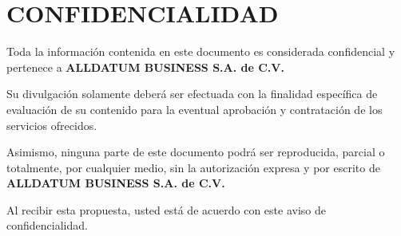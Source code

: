 \section*{CONFIDENCIALIDAD}

Toda la información contenida en este documento es considerada confidencial y pertenece a \textbf{ALLDATUM BUSINESS S.A. de C.V.}

Su divulgación solamente deberá ser efectuada con la finalidad específica de evaluación de su contenido para la eventual aprobación y contratación de los servicios ofrecidos.

Asimismo, ninguna parte de este documento podrá ser reproducida, parcial o totalmente, por cualquier medio, sin la autorización expresa y por escrito de \textbf{ALLDATUM BUSINESS S.A. de C.V.}

Al recibir esta propuesta, usted está de acuerdo con este aviso de confidencialidad.

\newpage